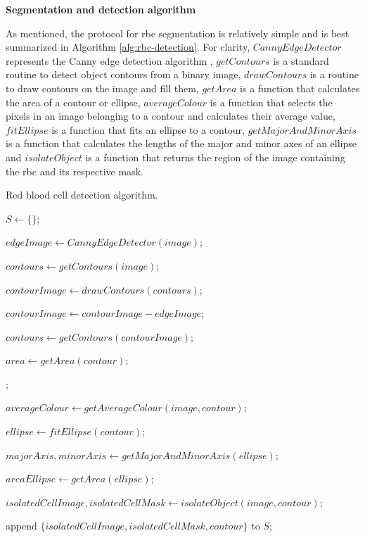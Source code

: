 \noindent \textbf{Segmentation and detection algorithm}

As mentioned, the protocol for \ac{rbc} segmentation is relatively simple and is best summarized in Algorithm \ref{alg:rbc-detection}. For clarity, $CannyEdgeDetector$ represents the Canny edge detection algorithm \cite{Canny1986-pi}, $getContours$ is a standard routine to detect object contours from a binary image, $drawContours$ is a routine to draw contours on the image and fill them, $getArea$ is a function that calculates the area of a contour or ellipse, $averageColour$ is a function that selects the pixels in an image belonging to a contour and calculates their average value, $fitEllipse$ is a function that fits an ellipse to a contour, $getMajorAndMinorAxis$ is a function that calculates the lengths of the major and minor axes of an ellipse and $isolateObject$ is a function that returns the region of the image containing the \ac{rbc} and its respective mask. 

\begin{algorithm}[!ht]
    \caption{Red blood cell detection algorithm.}\label{alg:rbc-detection}


    $S \gets \{\}$;

    $edgeImage \gets CannyEdgeDetector(image)$;

    $contours \gets getContours(image)$;

    $contourImage \gets drawContours(contours)$;

    $contourImage \gets contourImage - edgeImage$;

    $contours \gets getContours(contourImage)$;

     {
        $area \gets getArea(contour)$;

        ;
        {
            $averageColour \gets getAverageColour(image,contour)$;

            {
                $ellipse \gets fitEllipse(contour)$;

                $majorAxis,minorAxis \gets getMajorAndMinorAxis(ellipse)$;

                $areaEllipse \gets getArea(ellipse)$;

                {
                    $isolatedCellImage,isolatedCellMask \gets isolateObject(image,contour)$;

                    append $\{isolatedCellImage,isolatedCellMask,contour\}$ to $S$;
                }
            }
        }
    }
\end{algorithm}    

